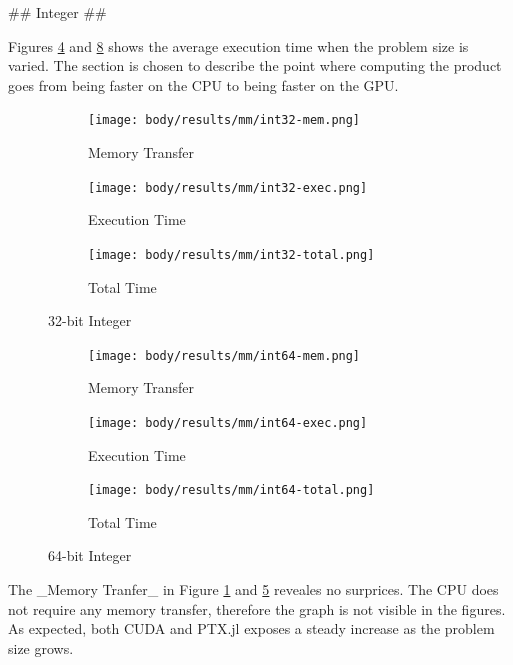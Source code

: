 \begin{markdown}
## Integer ##

Figures \ref{fig:res:mm:int32} and \ref{fig:res:mm:int64} shows the
average execution time when the problem size is varied. The section is
chosen to describe the point where computing the product goes from
being faster on the CPU to being faster on the GPU. 

\begin{figure}[H]
  \centering
  \begin{subfigure}{.33\textwidth}
    \centering
    \texttt{[image: body/results/mm/int32-mem.png]}
    \caption{Memory Transfer}
    \label{fig:res:mm:int32:mem}
  \end{subfigure}%
  \begin{subfigure}{.33\textwidth}
    \centering
    \texttt{[image: body/results/mm/int32-exec.png]}
    \caption{Execution Time}
    \label{fig:res:mm:int32:exec}
  \end{subfigure}%
  \begin{subfigure}{.33\textwidth}
    \centering
    \texttt{[image: body/results/mm/int32-total.png]}
    \caption{Total Time}
    \label{fig:res:mm:int32:tot}
  \end{subfigure}
  \caption{32-bit Integer}
  \label{fig:res:mm:int32}
\end{figure}

\begin{figure}[H]
  \centering
  \begin{subfigure}{.33\textwidth}
    \centering
    \texttt{[image: body/results/mm/int64-mem.png]}
    \caption{Memory Transfer}
    \label{fig:res:mm:int64:mem}
  \end{subfigure}%
  \begin{subfigure}{.33\textwidth}
    \centering
    \texttt{[image: body/results/mm/int64-exec.png]}
    \caption{Execution Time}
    \label{fig:res:mm:int64:exec}
  \end{subfigure}%
  \begin{subfigure}{.33\textwidth}
    \centering
    \texttt{[image: body/results/mm/int64-total.png]}
    \caption{Total Time}
    \label{fig:res:mm:int64:tot}
  \end{subfigure}
  \caption{64-bit Integer}
  \label{fig:res:mm:int64}
\end{figure}

The _Memory Tranfer_ in Figure \ref{fig:res:mm:int32:mem} and
\ref{fig:res:mm:int64:mem} reveales no surprices. The CPU does not
require any memory transfer, therefore the graph is not visible in the
figures. As expected, both CUDA and PTX.jl exposes a steady increase
as the problem size grows.


\end{markdown}
